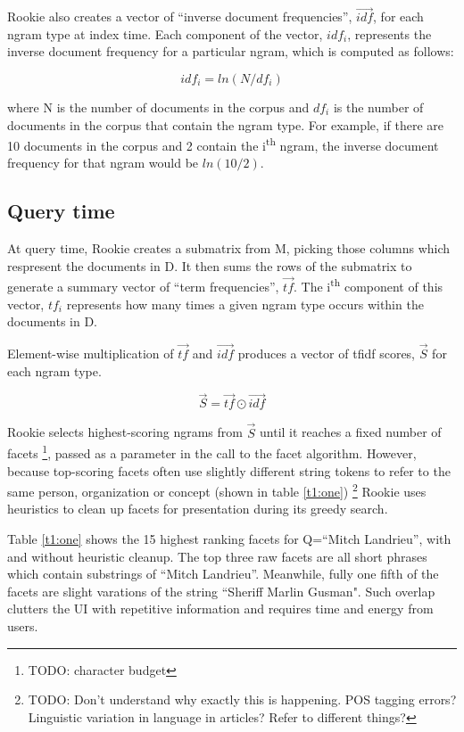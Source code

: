 \documentclass{article}
\begin{document}
Rookie also creates a vector of ``inverse document frequencies'', $\vec{idf}$, for each ngram type at index time. Each component of the vector, $idf_{i}$, represents the inverse document frequency for a particular ngram, which is computed as follows:

\begin{equation}
idf_{i} = ln(N/df_i)
\end{equation}

\noindent where N is the number of documents in the corpus and $df_{i}$ is the number of documents in the corpus that contain the ngram type. For example, if there are 10 documents in the corpus and 2 contain the i\textsuperscript{th} ngram, the inverse document frequency for that ngram would be $ln(10/2)$.

\subsection{Query time}

At query time, Rookie creates a submatrix from M, picking those columns which respresent the documents in D. It then sums the rows of the submatrix to generate a summary vector of ``term frequencies'', $\vec{tf}$. The i\textsuperscript{th} component of this vector, $tf_{i}$ represents how many times a given ngram type occurs within the documents in D. 

Element-wise multiplication of $\vec{tf}$ and $\vec{idf}$ produces a vector of tfidf scores, $\vec{S}$  for each ngram type.

\begin{equation}
\vec{S} = \vec{tf} \odot \vec{idf}
\end{equation}

Rookie selects highest-scoring ngrams from $\vec{S}$ until it reaches a fixed number of facets \footnote{TODO: character budget}, passed as a parameter in the call to the facet algorithm. However, because top-scoring facets often use slightly different string tokens to refer to the same person, organization or concept (shown in table \ref{t1:one}) \footnote{TODO: Don't understand why exactly this is happening. POS tagging errors? Linguistic variation in language in articles? Refer to different things?}
Rookie uses heuristics to clean up facets for presentation during its greedy search.

Table \ref{t1:one} shows the 15 highest ranking facets for Q=``Mitch Landrieu'', with and without heuristic cleanup. The top three raw facets are all short phrases which contain substrings of ``Mitch Landrieu''. Meanwhile, fully one fifth of the facets are slight varations of the string ``Sheriff Marlin Gusman". Such overlap clutters the UI with repetitive information and requires time and energy from users.
\end{document}
